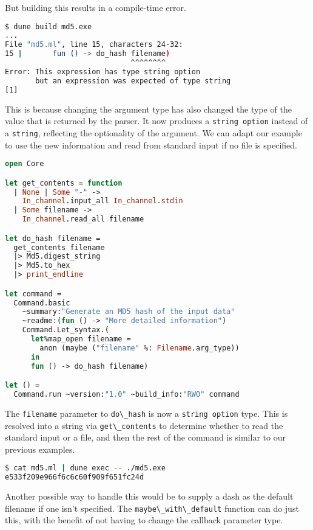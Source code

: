 But building this results in a compile-time error.

\begin{lstlisting}[language=bash]
$ dune build md5.exe
...
File "md5.ml", line 15, characters 24-32:
15 |       fun () -> do_hash filename)
                             ^^^^^^^^
Error: This expression has type string option
       but an expression was expected of type string
[1]
\end{lstlisting}

This is because changing the argument type has also changed the type of
the value that is returned by the parser. It now produces a
\passthrough{\lstinline!string option!} instead of a
\passthrough{\lstinline!string!}, reflecting the optionality of the
argument. We can adapt our example to use the new information and read
from standard input if no file is specified.

\begin{lstlisting}[language=Caml]
open Core

let get_contents = function
  | None | Some "-" ->
    In_channel.input_all In_channel.stdin
  | Some filename ->
    In_channel.read_all filename

let do_hash filename =
  get_contents filename
  |> Md5.digest_string
  |> Md5.to_hex
  |> print_endline

let command =
  Command.basic
    ~summary:"Generate an MD5 hash of the input data"
    ~readme:(fun () -> "More detailed information")
    Command.Let_syntax.(
      let%map_open filename =
        anon (maybe ("filename" %: Filename.arg_type))
      in
      fun () -> do_hash filename)

let () =
  Command.run ~version:"1.0" ~build_info:"RWO" command
\end{lstlisting}

The \passthrough{\lstinline!filename!} parameter to
\passthrough{\lstinline!do\_hash!} is now a
\passthrough{\lstinline!string option!} type. This is resolved into a
string via \passthrough{\lstinline!get\_contents!} to determine whether
to read the standard input or a file, and then the rest of the command
is similar to our previous examples.

\begin{lstlisting}[language=bash]
$ cat md5.ml | dune exec -- ./md5.exe
e533f209e966f6c6c60f909f651fc24d
\end{lstlisting}

Another possible way to handle this would be to supply a dash as the
default filename if one isn't specified. The
\passthrough{\lstinline!maybe\_with\_default!} function can do just
this, with the benefit of not having to change the callback parameter
type.


